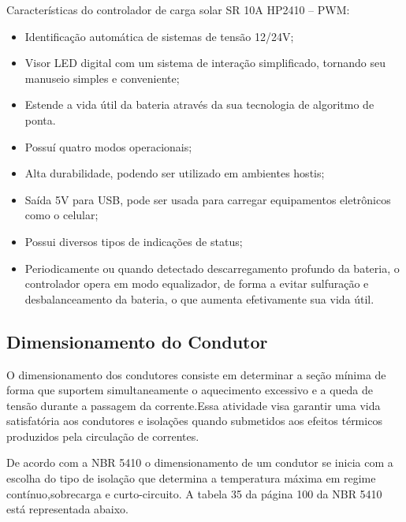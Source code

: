     Características do controlador de carga solar SR 10A HP2410 – PWM:

    \begin{itemize}
\item{Identificação automática de sistemas de tensão 12/24V;}
\item{Visor LED digital com um sistema de interação simplificado, tornando seu manuseio simples e conveniente;}
\item{Estende a vida útil da bateria através da sua tecnologia de algoritmo de ponta.}
\item{Possuí quatro modos operacionais;}
\item{Alta durabilidade, podendo ser utilizado em ambientes hostis;}
\item{Saída 5V para USB, pode ser usada para carregar equipamentos eletrônicos como o celular;}
\item{Possui diversos tipos de indicações de status;}
\item{Periodicamente ou quando detectado descarregamento profundo da bateria, o controlador opera em modo equalizador, de forma a evitar sulfuração e desbalanceamento da bateria, o que aumenta efetivamente sua vida útil.}

\end{itemize}



\subsection{Dimensionamento do Condutor}

\par O dimensionamento dos condutores consiste em determinar a seção mínima de forma que suportem simultaneamente o aquecimento excessivo e a queda de tensão durante a passagem da corrente.Essa atividade visa garantir uma vida satisfatória aos condutores e isolações quando submetidos aos efeitos térmicos produzidos pela circulação de correntes.
\par De acordo com a NBR 5410 o dimensionamento de um condutor se inicia com a escolha do tipo de isolação que determina a temperatura máxima em regime contínuo,sobrecarga e curto-circuito. A tabela 35 da página 100 da NBR 5410 está representada abaixo.




